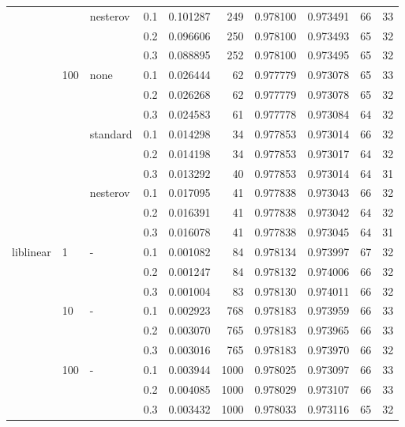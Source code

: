 \begin{table}[H]
\begin{tabular}{llllrrrrrr}
          &     & nesterov & 0.1 &  0.101287 &     249 &  0.978100 &  0.973491 &          66 &        33 \\
          &     &   & 0.2 &  0.096606 &     250 &  0.978100 &  0.973493 &          65 &        32 \\
          &     &   & 0.3 &  0.088895 &     252 &  0.978100 &  0.973495 &          65 &        32 \\
          & 100 & none & 0.1 &  0.026444 &      62 &  0.977779 &  0.973078 &          65 &        33 \\
          &     &   & 0.2 &  0.026268 &      62 &  0.977779 &  0.973078 &          65 &        32 \\
          &     &   & 0.3 &  0.024583 &      61 &  0.977778 &  0.973084 &          64 &        32 \\
          &     & standard & 0.1 &  0.014298 &      34 &  0.977853 &  0.973014 &          66 &        32 \\
          &     &   & 0.2 &  0.014198 &      34 &  0.977853 &  0.973017 &          64 &        32 \\
          &     &   & 0.3 &  0.013292 &      40 &  0.977853 &  0.973014 &          64 &        31 \\
          &     & nesterov & 0.1 &  0.017095 &      41 &  0.977838 &  0.973043 &          66 &        32 \\
          &     &   & 0.2 &  0.016391 &      41 &  0.977838 &  0.973042 &          64 &        32 \\
          &     &   & 0.3 &  0.016078 &      41 &  0.977838 &  0.973045 &          64 &        31 \\
liblinear & 1   & - & 0.1 &  0.001082 &      84 &  0.978134 &  0.973997 &          67 &        32 \\
          &     &   & 0.2 &  0.001247 &      84 &  0.978132 &  0.974006 &          66 &        32 \\
          &     &   & 0.3 &  0.001004 &      83 &  0.978130 &  0.974011 &          66 &        32 \\
          & 10  & - & 0.1 &  0.002923 &     768 &  0.978183 &  0.973959 &          66 &        33 \\
          &     &   & 0.2 &  0.003070 &     765 &  0.978183 &  0.973965 &          66 &        33 \\
          &     &   & 0.3 &  0.003016 &     765 &  0.978183 &  0.973970 &          66 &        32 \\
          & 100 & - & 0.1 &  0.003944 &    1000 &  0.978025 &  0.973097 &          66 &        33 \\
          &     &   & 0.2 &  0.004085 &    1000 &  0.978029 &  0.973107 &          66 &        33 \\
          &     &   & 0.3 &  0.003432 &    1000 &  0.978033 &  0.973116 &          65 &        32 \\
\bottomrule
\end{tabular}
\end{table}
